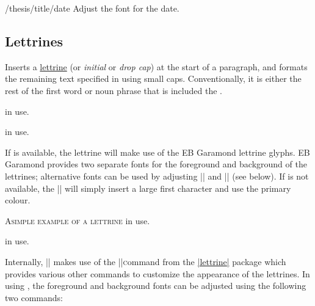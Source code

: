 \begin{fontkey}{/thesis/title/date}
  Adjust the font for the date.
\end{fontkey}

\subsection{Lettrines}
\label{subsec:lettrines}

\begin{command}{\thesislettrine{}}
  Inserts a \href{https://en.wikipedia.org/wiki/Initial}{lettrine} (or
  \emph{initial} or \emph{drop cap}) at the start of a paragraph, and formats
  the remaining text specified in  using small caps.  Conventionally,
  it is either the rest of the first word or noun phrase that is included the
  .

  \hfill\begin{minipage}{0.9\textwidth}
     in use.  \lipsum[2]
  \end{minipage}

\begin{codeexample}[execute code=false]
 in use.  \lipsum[2]
\end{codeexample}

  If \LuaLaTeX{} is available, the lettrine will make use of the EB Garamond
  lettrine glyphs.  EB Garamond provides two separate fonts for the foreground
  and background of the lettrines; alternative fonts can be used by adjusting
  || and || (see below).  If \LuaLaTeX{} is not available,
  the |\thesislettrine| will simply insert a large first character and use the
  primary colour.

  \hfill\begin{minipage}{0.9\textwidth}
    \setcounter{DefaultLines}{3}
    \renewcommand{\DefaultLoversize}{0}
    \renewcommand{\DefaultLraise}{0}
    \setlength{\DefaultNindent}{0.5ex}
    \lettrine{\textcolor{primary}{A}}{simple example of a lettrine} in use.  \lipsum[2]
  \end{minipage}

\begin{codeexample}[execute code=false]
 in use.  \lipsum[2]
\end{codeexample}

  Internally, |\thesislettrine| makes use of the |\lettrine| command from the
  \href{http://ctan.org/pkg/lettrine}{|lettrine|} package which provides various
  other commands to customize the appearance of the lettrines.  In using
  \LuaLaTeX{}, the foreground and background fonts can be adjusted using the
  following two commands:

\end{command}

